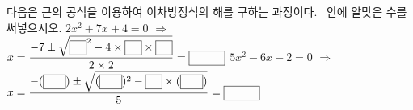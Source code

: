 다음은 근의 공식을 이용하여 이차방정식의 해를 구하는 과정이다. \blank\ 안에 알맞은 수를 써넣으시오.
 $2x^2+7x+4=0$ $\Rightarrow$\\ \hspace*{1.5em}$x=\dfrac{-7\pm\sqrt{\blank^2-4\times\blank\times\blank}}{2\times2}=\blank[3.2em]$
 $5x^2-6x-2=0$ $\Rightarrow$\\ \hspace*{1.5em}$x=\dfrac{-(\blank[2em])\pm\sqrt{(\blank[2em])^2-\blank\times(\blank[2em])}}{5}=\blank[3.2em]$
